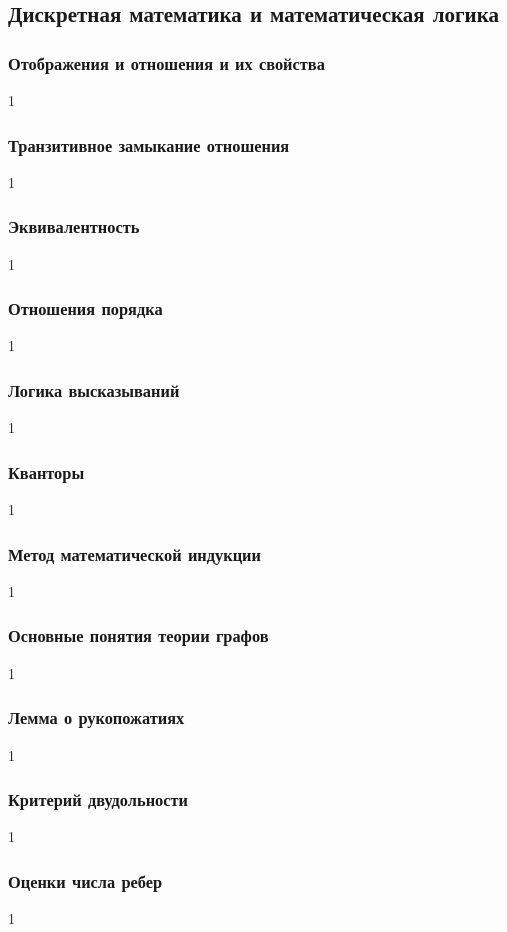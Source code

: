 \documentclass[14pt]{matmex-diploma}
\begin{document}
    \subsection{Дискретная математика и математическая логика}
    
        \subsubsection*{Отображения и отношения и их свойства}
            1
        \subsubsection*{Транзитивное замыкание отношения}
            1
        \subsubsection*{Эквивалентность}
            1
        \subsubsection*{Отношения порядка}
            1
        \subsubsection*{Логика высказываний}
            1
        \subsubsection*{Кванторы}
            1
        \subsubsection*{Метод математической индукции}
            1
        \subsubsection*{Основные понятия теории графов}
            1
        \subsubsection*{Лемма о рукопожатиях}
            1
        \subsubsection*{Критерий двудольности}
            1
        \subsubsection*{Оценки числа ребер}
            1
\end{document}
